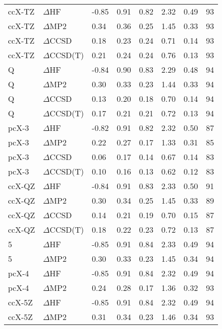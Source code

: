 \begin{table}
\begin{tabular}{l l l l l l l l }
    ccX-TZ & $\Delta$HF & -0.85 & 0.91 & 0.82 & 2.32 & 0.49 & 93 \\ 
    ccX-TZ & $\Delta$MP2 & 0.34 & 0.36 & 0.25 & 1.45 & 0.33 & 93 \\ 
    ccX-TZ & $\Delta$CCSD & 0.18 & 0.23 & 0.24 & 0.71 & 0.14 & 93 \\ 
    ccX-TZ & $\Delta$CCSD(T) & 0.21 & 0.24 & 0.24 & 0.76 & 0.13 & 93 \\ 
    Q & $\Delta$HF & -0.84 & 0.90 & 0.83 & 2.29 & 0.48 & 94 \\ 
    Q & $\Delta$MP2 & 0.30 & 0.33 & 0.23 & 1.44 & 0.33 & 94 \\ 
    Q & $\Delta$CCSD & 0.13 & 0.20 & 0.18 & 0.70 & 0.14 & 94 \\ 
    Q & $\Delta$CCSD(T) & 0.17 & 0.21 & 0.21 & 0.72 & 0.13 & 94 \\ 
    pcX-3 & $\Delta$HF & -0.82 & 0.91 & 0.82 & 2.32 & 0.50 & 87 \\ 
    pcX-3 & $\Delta$MP2 & 0.22 & 0.27 & 0.17 & 1.33 & 0.31 & 85 \\ 
    pcX-3 & $\Delta$CCSD & 0.06 & 0.17 & 0.14 & 0.67 & 0.14 & 83 \\ 
    pcX-3 & $\Delta$CCSD(T) & 0.10 & 0.16 & 0.13 & 0.62 & 0.12 & 83 \\ 
    ccX-QZ & $\Delta$HF & -0.84 & 0.91 & 0.83 & 2.33 & 0.50 & 91 \\ 
    ccX-QZ & $\Delta$MP2 & 0.30 & 0.34 & 0.25 & 1.45 & 0.33 & 89 \\ 
    ccX-QZ & $\Delta$CCSD & 0.14 & 0.21 & 0.19 & 0.70 & 0.15 & 87 \\ 
    ccX-QZ & $\Delta$CCSD(T) & 0.18 & 0.22 & 0.23 & 0.72 & 0.13 & 87 \\ 
    5 & $\Delta$HF & -0.85 & 0.91 & 0.84 & 2.33 & 0.49 & 94 \\ 
    5 & $\Delta$MP2 & 0.30 & 0.33 & 0.23 & 1.45 & 0.34 & 94 \\ 
    pcX-4 & $\Delta$HF & -0.85 & 0.91 & 0.84 & 2.32 & 0.49 & 94 \\ 
    pcX-4 & $\Delta$MP2 & 0.24 & 0.28 & 0.17 & 1.36 & 0.32 & 93 \\ 
    ccX-5Z & $\Delta$HF & -0.85 & 0.91 & 0.84 & 2.32 & 0.49 & 94 \\ 
    ccX-5Z & $\Delta$MP2 & 0.31 & 0.34 & 0.23 & 1.46 & 0.34 & 93 \\ 
    \bottomrule
  \end{tabular}
\end{table}
